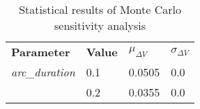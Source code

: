 
                \begin{table}[]
                \centering
                \begin{tabular}{l l l l}
                \rowcolor[HTML]{EFEFEF} \textbf{Parameter} & \textbf{Value} & \textbf{$\mu_{\Delta V}$} & \textbf{$\sigma_{\Delta V}$} \\
                \textit{arc\_duration} & 0.1 & 0.0505 & 0.0 \\
 & 0.2 & 0.0355 & 0.0 \\

                \end{tabular}
                \caption{Statistical results of Monte Carlo sensitivity analysis}
                \label{tab:SensitivityAnalysis}
                \end{table}
                